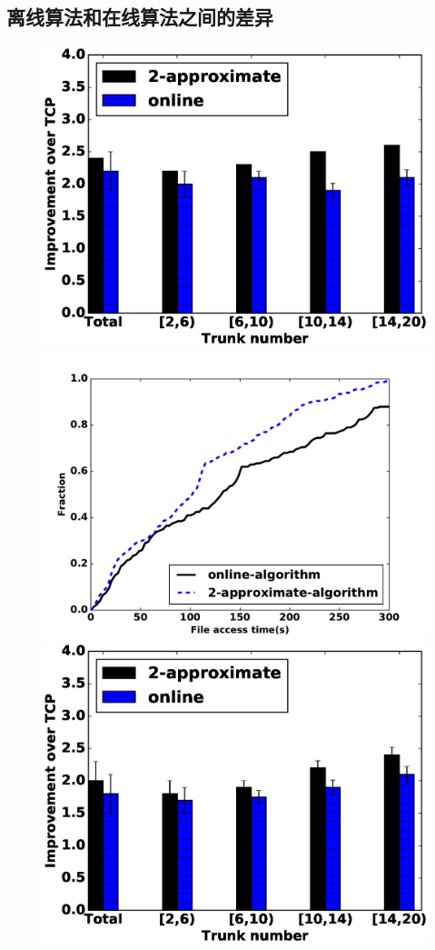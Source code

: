 \subsection{离线算法和在线算法之间的差异}
\begin{figure}[h]
\setlength{\abovecaptionskip}{0pt} 
\setlength{\belowcaptionskip}{1pt} 
  \centering%
    {\includegraphics[width=0.5\columnwidth]{figures/DTARGET/picture/evaluation/ex3/on_off_2.eps}}%
      {\includegraphics[width=0.5\columnwidth]{figures/DTARGET/picture/evaluation/ex3/online_offline.pdf}}
    {\includegraphics[width=0.5\columnwidth]{figures/DTARGET/picture/evaluation/ex3/on_off_3.eps}}%

\end{figure}
